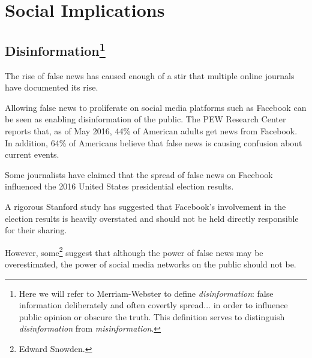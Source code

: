 
\section{Social Implications}


\subsection[Disinformation]{Disinformation\footnote{Here we will refer to Merriam-Webster to define \emph{disinformation}: false information deliberately and often covertly spread... in order to influence public opinion or obscure the truth. \cite{dictionary} This definition serves to distinguish \emph{disinformation} from \emph{misinformation}.}}

\par The rise of false news has caused enough of a stir that multiple online journals have documented its rise. \cite{telegraph_fake_news,npr_fake_news}

\par Allowing false news to proliferate on social media platforms such as Facebook can be seen as enabling disinformation of the public. \cite{tc_facebook_responsibility} The PEW Research Center reports that, as of May 2016, 44\% of American adults get news from Facebook. \cite{pew_social_media_news} In addition, 64\% of Americans believe that false news is causing confusion about current events. \cite{pew_fn_confusion}

\par Some journalists have claimed that the spread of false news on Facebook influenced the 2016 United States presidential election results. \cite{npr_fake_news}

\par A rigorous Stanford study has suggested that Facebook's involvement in the election results is heavily overstated and should not be held directly responsible for their sharing. \cite{stanford_fake_news_study}

\par However, some\footnote{Edward Snowden.} suggest that although the power of false news may be overestimated, the power of social media networks on the public should not be. \cite{tc_snowden_fb}

